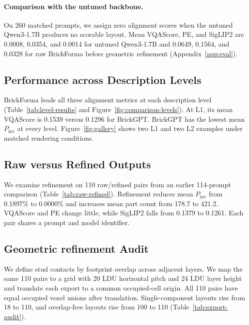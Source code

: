 \documentclass[letterpaper]{article} %
\begin{document}
\paragraph{Comparison with the untuned backbone.} On 260 matched prompts, we assign zero alignment scores when the untuned Qwen3-1.7B produces no scorable layout. Mean VQAScore, PE, and SigLIP2 are 0.0008, 0.0354, and 0.0014 for untuned Qwen3-1.7B and 0.0649, 0.1564, and 0.0328 for raw BrickForma before geometric refinement (Appendix~\ref{app:eval}).

\subsection{Performance across Description Levels}

BrickForma leads all three alignment metrics at each description level (Table~\ref{tab:level-results} and Figure~\ref{fig:comparison-levels}). At L1, its mean VQAScore is 0.1539 versus 0.1296 for BrickGPT. BrickGPT has the lowest mean $P_{\mathrm{inv}}$ at every level. Figure~\ref{fig:gallery} shows two L1 and two L2 examples under matched rendering conditions.



\subsection{Raw versus Refined Outputs}

We examine refinement on 110 raw/refined pairs from an earlier 114-prompt comparison (Table~\ref{tab:raw-refined}). Refinement reduces mean $P_{\mathrm{inv}}$ from 0.1897\% to 0.0000\% and increases mean part count from 178.7 to 421.2. VQAScore and PE change little, while SigLIP2 falls from 0.1379 to 0.1261. Each pair shares a prompt and model identifier.

\subsection{Geometric refinement Audit}
\label{sec:diagnostics}
We define stud contacts by footprint overlap across adjacent layers. We map the same 110 pairs to a grid with 20 LDU horizontal pitch and 24 LDU layer height and translate each export to a common occupied-cell origin. All 110 pairs have equal occupied voxel unions after translation. Single-component layouts rise from 18 to 110, and overlap-free layouts rise from 100 to 110 (Table~\ref{tab:export-audit}).

\end{document}
